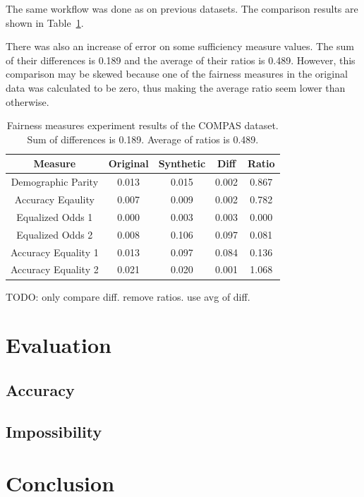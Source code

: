 \documentclass[manuscript,screen,review,anonymous]{acmart}
\begin{document}
The same workflow was done as on previous datasets. The comparison results are shown in Table~\ref{tab:diabetes_score}.

There was also an increase of error on some sufficiency measure values. The sum of their differences is 0.189 and the average of their ratios is 0.489. However, this comparison may be skewed because one of the fairness measures in the original data was calculated to be zero, thus making the average ratio seem lower than otherwise.

\begin{table}[h]
\caption{Fairness measures experiment results of the COMPAS dataset. Sum of differences is 0.189. Average of ratios is 0.489.}
\label{tab:diabetes_score}
\begin{tabular}{ccccc}
\toprule
\textbf{Measure} & \textbf{Original} & \textbf{Synthetic} & \textbf{Diff} & \textbf{Ratio} \\
\midrule
Demographic Parity  & 0.013 & 0.015 & 0.002 & 0.867 \\
Accuracy Eqaulity   & 0.007 & 0.009 & 0.002 & 0.782 \\
Equalized Odds 1    & 0.000 & 0.003 & 0.003 & 0.000 \\
Equalized Odds 2    & 0.008 & 0.106 & 0.097 & 0.081 \\
Accuracy Equality 1 & 0.013 & 0.097 & 0.084 & 0.136 \\
Accuracy Equality 2 & 0.021 & 0.020 & 0.001 & 1.068 \\
\bottomrule
\end{tabular}
\end{table}

TODO: only compare diff. remove ratios. use avg of diff.

\section{Evaluation}

\subsection{Accuracy}

\subsection{Impossibility}

\section{Conclusion}
\end{document}
